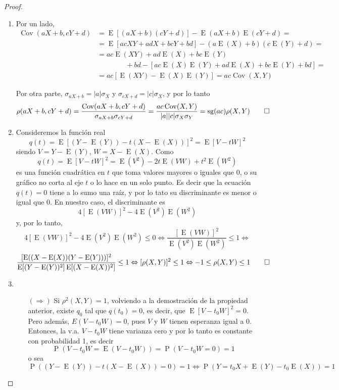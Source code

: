 \documentclass[11pt]{article}
\theoremstyle{plain}
\theoremstyle{definition}
\theoremstyle{remark}
\newcommand{\proba}{\ensuremath{\operatorname{P}}}  %
\newcommand{\esp}[0]{\ensuremath{\operatorname{E}}}  %
\newcommand{\cov}[0]{\ensuremath{\operatorname{Cov}}}  %
\begin{document}
      \begin{proof} \
        \begin{enumerate}
          \item Por un lado,
          \[ \begin{split}
            \cov(aX + b,cY + d) &= \esp[(aX + b)(cY + d)] - \esp(aX + b) \esp(cY + d) = \\
            &= \esp[acXY + adX + bcY + bd ] - (a \esp(X) + b)(c \esp(Y) + d) = \\
            &= ac \esp(XY) + ad \esp(X) + bc \esp(Y) \\
            &\qquad \qquad + bd - [ac \esp(X) \esp(Y) + ad \esp(X) + bc \esp(Y) + bd] = \\
            &= ac [\esp(XY) - \esp(X) \esp(Y)] = ac \cov(X,Y)
          \end{split} \]

          Por otra parte, $\sigma_{aX + b} = \vert a \vert \sigma_X$ y $\sigma_{cX + d} = \vert c \vert \sigma_X$, y por lo tanto
          \[ \rho(aX + b,cY + d) = \frac{\cov(aX + b, cY + d)}{\sigma_{aX + b} \sigma_{cY + d}} = \frac{ac \cov(X,Y)}{\vert a \vert \vert c \vert \sigma_X  \sigma_Y} = \operatorname{sg}(ac) \rho(X,Y) \qedhere \]

          \item Consideremos la función real
          \[ q(t) = \esp[(Y - \esp(Y)) - t(X - \esp(X))]^2 = \esp[V - tW]^2 \]
          siendo $V = Y - \esp(Y)$, $W = X - \esp(X)$. Como
          \[ q(t) = \esp[V - tW]^2 = \esp(V^2) - 2t \esp(VW) + t^2 \esp(W^2) \]
          es una función cuadrática en $t$ que toma valores mayores o iguales que 0, o su gráfico no corta al eje $t$ o lo hace en un solo punto. Es decir que la ecuación $q(t) = 0$ tiene a lo sumo una raíz, y por lo tato su discriminante es menor o igual que 0. En nuestro caso, el discriminante es
          \[ 4[\esp(VW)]^2 - 4 \esp(V^2) \esp(W^2) \]
          y, por lo tanto,
          \[ 4[\esp(VW)]^2 - 4 \esp(V^2) \esp(W^2) \leq 0 \Leftrightarrow \frac{[\esp(VW)]^2}{\esp(V^2) \esp(W^2)} \leq 1 \Leftrightarrow\]
          \[ \frac{[\esp((X - \esp(X))(Y - \esp(Y)))]^2}{\esp[(Y - \esp(Y))^2] \esp[(X - \esp(X))^2]} \leq 1 \Leftrightarrow [\rho(X,Y)]^2 \leq 1 \Leftrightarrow -1 \leq \rho(X,Y) \leq 1 \qedhere \]

          \item \begin{itemize}
            \item[$(\Rightarrow)$] Si $\rho^2(X,Y) = 1$, volviendo a la demostración de la propiedad anterior, existe $q_0$ tal que $q(t_0) = 0$, es decir, que $\esp[V - t_0 W]^2 = 0$.
            Pero además, $E(V - t_0 W) = 0$, pues $V$ y $W$ tienen esperanza igual a 0. Entonces, la v.a. $V - t_0 W$ tiene varianza cero y por lo tanto es constante con probabilidad 1, es decir
            \[ \proba(V - t_0 W = \esp(V - t_0 W)) = \proba(V - t_0 W = 0) = 1 \]
            o sea
            \[ \proba((Y - \esp(Y)) - t(X - \esp(X)) = 0) = 1 \Leftrightarrow \proba(Y = t_0X + \esp(Y) - t_0 \esp(X)) = 1\]


\end{itemize}
\end{enumerate}
\end{proof}
\end{document}
